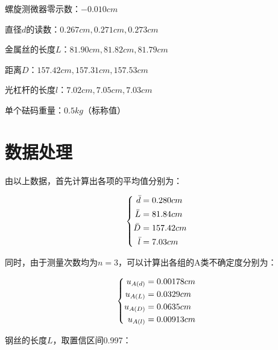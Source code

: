 \documentclass[a4paper]{ltxdoc}
\begin{document}
\begin{multicols}{2}
    \smallskip

    螺旋测微器零示数：$-0.010cm$

    \smallskip

    直径$d$的读数：$0.267cm,0.271cm,0.273cm$

    \smallskip

    金属丝的长度$L$：$81.90cm,81.82cm,81.79cm$

    \smallskip

    距离$D$：$157.42cm,157.31cm,157.53cm$

    \smallskip

    光杠杆的长度$l$：$7.02cm,7.05cm,7.03cm$

    \smallskip

    单个砝码重量：$0.5kg$（标称值）

    \section{数据处理}

    由以上数据，首先计算出各项的平均值分别为：

    \begin{equation}
        \left\{
        \begin{aligned}
            \bar d & = 0.280cm  \\
            \bar L & = 81.84cm  \\
            \bar D & = 157.42cm \\
            \bar l & = 7.03cm   \\
        \end{aligned}
        \right.
        \notag
    \end{equation}

    同时，由于测量次数均为$n=3$，可以计算出各组的A类不确定度分别为：

    \begin{equation}
        \left\{
        \begin{aligned}
            u_{A(d)} & = 0.00178cm \\
            u_{A(L)} & = 0.0329cm  \\
            u_{A(D)} & = 0.0635cm  \\
            u_{A(l)} & = 0.00913cm \\
        \end{aligned}
        \right.
        \notag
    \end{equation}

    钢丝的长度$L$，取置信区间0.997：


\end{multicols}
\end{document}
